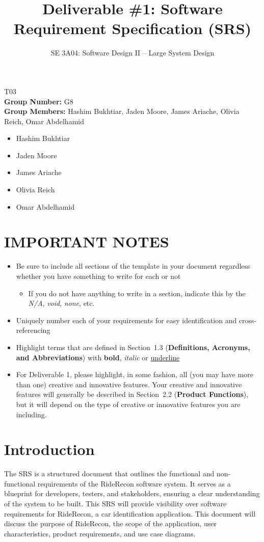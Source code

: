 \documentclass[]{article}
\title{Deliverable \#1: Software Requirement Specification (SRS)}
\author{SE 3A04: Software Design II -- Large System Design}
\date{}
\begin{document}
 

\maketitle	
{} T03\\
{\bf Group Number:} G8 \\
{\bf Group Members:} Hashim Bukhtiar, Jaden Moore, James Ariache, Olivia Reich, Omar Abdelhamid
\begin{itemize}
        \item Hashim Bukhtiar
        \item Jaden Moore
        \item James Ariache
        \item Olivia Reich
        \item Omar Abdelhamid
\end{itemize}

\section*{IMPORTANT NOTES}
\begin{itemize}
	\item Be sure to include all sections of the template in your document regardless whether you have something to write for each or not
	\begin{itemize}
		\item If you do not have anything to write in a section, indicate this by the \emph{N/A}, \emph{void}, \emph{none}, etc.
	\end{itemize}
	\item Uniquely number each of your requirements for easy identification and cross-referencing
	\item Highlight terms that are defined in Section~1.3 (\textbf{Definitions, Acronyms, and Abbreviations}) with \textbf{bold}, \emph{italic} or \underline{underline}
	\item For Deliverable 1, please highlight, in some fashion, all (you may have more than one) creative and innovative features. Your creative and innovative features will generally be described in Section~2.2 (\textbf{Product Functions}), but it will depend on the type of creative or innovative features you are including.
\end{itemize}

\newpage
\section{Introduction}
\label{sec:introduction}
The SRS is a structured document that outlines the functional and non-functional requirements of the RideRecon software system. It serves as a blueprint for developers, testers, and stakeholders, ensuring a clear understanding of the system to be built. This SRS will provide visibility over software requirements for RideRecon, a car identification application. 
This document will discuss the purpose of RideRecon, the scope of the application, user characteristics, product requirements, and use case diagrams.
\end{document}
